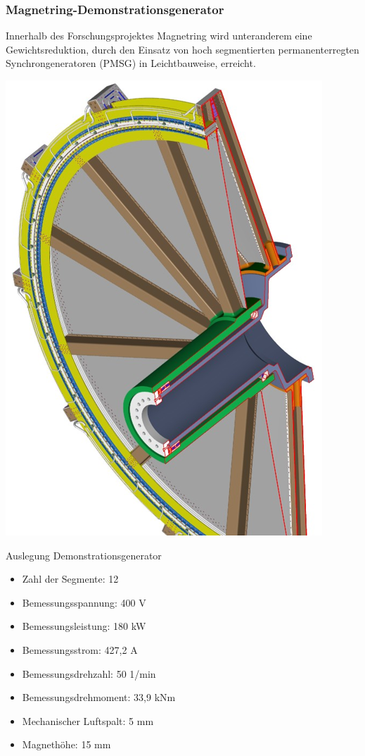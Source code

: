 \documentclass[serif,11pt, xcolor=table]{beamer}
\begin{document}
\begin{frame}
	\frametitle{Magnetring-Demonstrationsgenerator
	}
	\tiny{Innerhalb des Forschungsprojektes Magnetring wird unteranderem eine Gewichtsreduktion, durch den Einsatz von hoch segmentierten permanenterregten Synchrongeneratoren (PMSG) in Leichtbauweise, erreicht. }
	\begin{floatingfigure}[r]{0.30\linewidth}
		\includegraphics[scale=0.38]{Abbildungen/Demonstrator2.png}
		
	\end{floatingfigure}
	\vskip 0.2cm
	Auslegung Demonstrationsgenerator
	\begin{itemize}\itemsep=3ex
		\item Zahl der Segmente: 12
		\item Bemessungsspannung: 400 V
		\item Bemessungsleistung: 180 kW
		\item Bemessungsstrom: 427,2 A
		\item Bemessungsdrehzahl: 50 1/min
		\item Bemessungsdrehmoment: 33,9 kNm
		\item Mechanischer Luftspalt: 5 mm
		\item Magnethöhe: 15 mm
		
	\end{itemize}
	
\end{frame}
\end{document}
